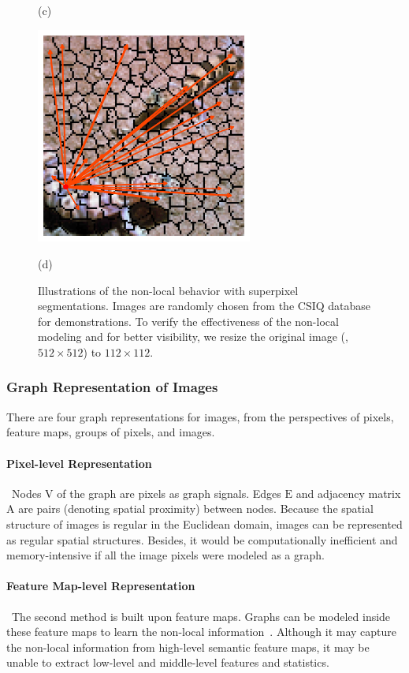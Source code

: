 \begin{figure}[!ht]
\begin{minipage}[t]{.49\linewidth}
		\centerline{(c)}
		\label{FLOWER}
	\end{minipage}
	\begin{minipage}[t]{.49\linewidth}
		\includegraphics[width=2.8in]{images/geckos_superpixel.jpg}
		\centerline{(d)}
		\label{GECKOS}
	\end{minipage}
	\caption{Illustrations of the non-local behavior with superpixel segmentations. Images are randomly chosen from the CSIQ database for demonstrations. To verify the effectiveness of the non-local modeling and for better visibility, we resize the original image (\ie,~$512 \times 512$) to $112 \times 112$.}
	\label{Non-local Behavior from the TID2013 database with superpixel - 2}
\end{figure}

\subsubsection{Graph Representation of Images}
There are four graph representations for images, from the perspectives of pixels, feature maps, groups of pixels, and images.
\paragraph{Pixel-level Representation}~Nodes $\boldsymbol{\mathrm{V}}$ of the graph are pixels as graph signals. Edges $\boldsymbol{\mathrm{E}}$ and adjacency matrix $\boldsymbol{\mathrm{A}}$ are pairs (denoting spatial proximity) between nodes. Because the spatial structure of images is regular in the Euclidean domain, images can be represented as regular spatial structures. Besides, it would be computationally inefficient and memory-intensive if all the image pixels were modeled as a graph. 

\paragraph{Feature Map-level Representation}~The second method is built upon feature maps. Graphs can be modeled inside these feature maps to learn the non-local information~\citep{wang2018non, yue2018compact, she2021hierarchical, zhang2019self, zhang2010non}. Although it may capture the non-local information from high-level semantic feature maps, it may be unable to extract low-level and middle-level features and statistics.

